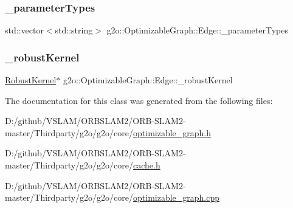 \mbox{\label{classg2o_1_1_optimizable_graph_1_1_edge_a08666609850240956c64c95ae5ae0f2c}} 
\subsubsection{\texorpdfstring{\+\_\+parameter\+Types}{\_parameterTypes}}
{\footnotesize\ttfamily std\+::vector$<$std\+::string$>$ g2o\+::\+Optimizable\+Graph\+::\+Edge\+::\+\_\+parameter\+Types\hspace{0.3cm}{\ttfamily [protected]}}

\mbox{\label{classg2o_1_1_optimizable_graph_1_1_edge_a6b942321f9e4e82051d529efb255af35}} 
\subsubsection{\texorpdfstring{\+\_\+robust\+Kernel}{\_robustKernel}}
{\footnotesize\ttfamily \mbox{\hyperlink{classg2o_1_1_robust_kernel}{Robust\+Kernel}}$\ast$ g2o\+::\+Optimizable\+Graph\+::\+Edge\+::\+\_\+robust\+Kernel\hspace{0.3cm}{\ttfamily [protected]}}



The documentation for this class was generated from the following files\+:\begin{DoxyCompactItemize}
\item 
D\+:/github/\+V\+S\+L\+A\+M/\+O\+R\+B\+S\+L\+A\+M2/\+O\+R\+B-\/\+S\+L\+A\+M2-\/master/\+Thirdparty/g2o/g2o/core/\mbox{\hyperlink{optimizable__graph_8h}{optimizable\+\_\+graph.\+h}}\item 
D\+:/github/\+V\+S\+L\+A\+M/\+O\+R\+B\+S\+L\+A\+M2/\+O\+R\+B-\/\+S\+L\+A\+M2-\/master/\+Thirdparty/g2o/g2o/core/\mbox{\hyperlink{cache_8h}{cache.\+h}}\item 
D\+:/github/\+V\+S\+L\+A\+M/\+O\+R\+B\+S\+L\+A\+M2/\+O\+R\+B-\/\+S\+L\+A\+M2-\/master/\+Thirdparty/g2o/g2o/core/\mbox{\hyperlink{optimizable__graph_8cpp}{optimizable\+\_\+graph.\+cpp}}\end{DoxyCompactItemize}
